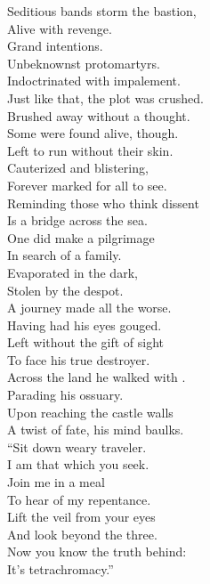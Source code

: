 Seditious bands storm the bastion, \\
Alive with revenge. \\
Grand intentions. \\
Unbeknownst protomartyrs. \\
Indoctrinated with impalement. \\

Just like that, the plot was crushed. \\
Brushed away without a thought. \\
Some were found alive, though. \\
Left to run without their skin. \\
Cauterized and blistering, \\
Forever marked for all to see. \\
Reminding those who think dissent \\
Is a bridge across the sea. \\

One did make a pilgrimage \\
In search of a family. \\
Evaporated in the dark, \\
Stolen by the despot. \\
A journey made all the worse. \\
Having had his eyes gouged. \\
Left without the gift of sight \\
To face his true destroyer. \\

Across the land he walked with . \\
Parading his ossuary. \\
Upon reaching the castle walls \\
A twist of fate, his mind baulks. \\

``Sit down weary traveler. \\
I am that which you seek. \\
Join me in a meal \\
To hear of my repentance. \\
Lift the veil from your eyes \\
And look beyond the three. \\
Now you know the truth behind: \\
It's tetrachromacy.'' \\


